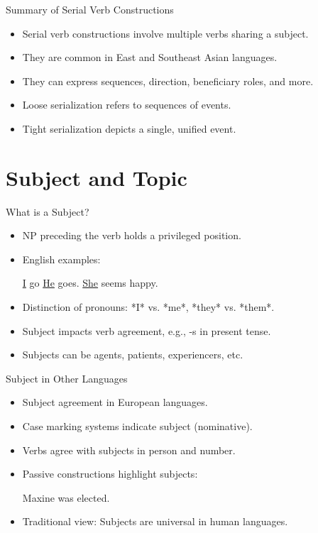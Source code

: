 \documentclass{beamer}
\newcommand{\ul}[1]{\uline{#1}}
\begin{document}
\begin{frame}{Summary of Serial Verb Constructions}
\begin{itemize}
    \item Serial verb constructions involve multiple verbs sharing a subject.
    \item They are common in East and Southeast Asian languages.
    \item They can express sequences, direction, beneficiary roles, and more.
    \item Loose serialization refers to sequences of events.
    \item Tight serialization depicts a single, unified event.
\end{itemize}
\end{frame}

\section{Subject and Topic}

\begin{frame}{What is a Subject?}
  \begin{itemize}
    \item NP preceding the verb holds a privileged position.
    \item English examples:
    \begin{exe}
    \ex
\ul{I} go
\ex
\ul{He} goes.
\ex
\ul{She} seems happy.
\end{exe}
    \item Distinction of pronouns: *I* vs. *me*, *they* vs. *them*.
    \item Subject impacts verb agreement, e.g., -s in present tense.
    \item Subjects can be agents, patients, experiencers, etc.
  \end{itemize}
\end{frame}

\begin{frame}{Subject in Other Languages}
  \begin{itemize}
    \item Subject agreement in European languages.
    \item Case marking systems indicate subject (nominative).
    \item Verbs agree with subjects in person and number.
    \item Passive constructions highlight subjects:
       \begin{exe}
    \ex
      Maxine was elected.
    \end{exe}
    \item Traditional view: Subjects are universal in human languages.
  \end{itemize}
\end{frame}
\end{document}
